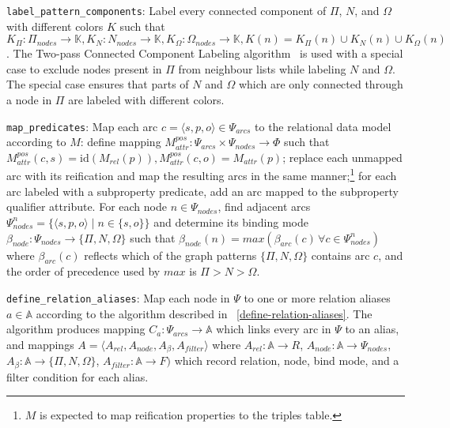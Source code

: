 \documentclass[conference,letterpaper]{IEEEtran}
\begin{document}
{\tt label\_pattern\_components}: Label every connected component of
$\Pi$, $N$, and $\Omega$ with different colors $K$ such that $K_\Pi:
\Pi_{nodes} \to \mathbb{K}, K_N: N_{nodes} \to \mathbb{K}, K_\Omega:
\Omega_{nodes} \to \mathbb{K}, K(n) = K_\Pi(n) \cup K_N(n) \cup
K_\Omega(n)$. The Two-pass Connected Component Labeling
algorithm~\cite{shapiro} is used with a special case to exclude nodes
present in $\Pi$ from neighbour lists while labeling $N$ and $\Omega$.
The special case ensures that parts of $N$ and $\Omega$ which are only
connected through a node in $\Pi$ are labeled with different colors.

{\tt map\_predicates}: Map each arc $c = \langle s, p, o \rangle \in
\Psi_{arcs}$ to the relational data model according to $M$: define
mapping $M_{attr}^{pos}: \Psi_{arcs} \times \Psi_{nodes} \to \Phi$ such
that $M_{attr}^{pos}(c, s) = \mathrm{id}( M_{rel}(p) ),
M_{attr}^{pos}(c, o) = M_{attr}(p)$; replace each unmapped arc with its
reification and map the resulting arcs in the same manner;\footnote{$M$
is expected to map reification properties to the triples table.} for
each arc labeled with a subproperty predicate, add an arc mapped to the
subproperty qualifier attribute. For each node $n \in \Psi_{nodes}$,
find adjacent arcs $\Psi_{nodes}^n = \{\langle s, p, o \rangle \mid n
\in \{s, o\}\}$ and determine its binding mode $\beta_{node}:
\Psi_{nodes} \to \{ \Pi, N, \Omega \}$ such that $\beta_{node}(n) =
max(\beta_{arc}(c) \, \forall c \in \Psi_{nodes}^n)$ where
$\beta_{arc}(c)$ reflects which of the graph patterns $\{ \Pi, N, \Omega
\}$ contains arc $c$, and the order of precedence used by $max$ is $\Pi
> N > \Omega$.

{\tt define\_relation\_aliases}: Map each node in $\Psi$ to one or more
relation aliases $a \in \mathbb{A}$ according to the algorithm described
in \figurename~\ref{define-relation-aliases}. The algorithm produces
mapping $C_a: \Psi_{arcs} \to \mathbb{A}$ which links every arc in
$\Psi$ to an alias, and mappings $A = \langle A_{rel}, A_{node},
A_\beta, A_{filter} \rangle$ where $A_{rel}: \mathbb{A} \to R$,
$A_{node}: \mathbb{A} \to \Psi_{nodes}$, $A_\beta: \mathbb{A} \to \{
\Pi, N, \Omega \}$, $A_{filter}: \mathbb{A} \to F)$ which record
relation, node, bind mode, and a filter condition for each alias.
\end{document}

